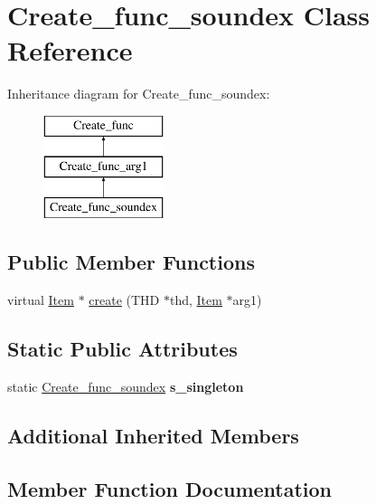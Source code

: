 \hypertarget{classCreate__func__soundex}{}\section{Create\+\_\+func\+\_\+soundex Class Reference}
\label{classCreate__func__soundex}
Inheritance diagram for Create\+\_\+func\+\_\+soundex\+:\begin{figure}[H]
\begin{center}
\leavevmode
\includegraphics[height=3.000000cm]{classCreate__func__soundex}
\end{center}
\end{figure}
\subsection*{Public Member Functions}
\begin{DoxyCompactItemize}
\item 
virtual \mbox{\hyperlink{classItem}{Item}} $\ast$ \mbox{\hyperlink{classCreate__func__soundex_a9c47f0bb57338136ad6397f320706bd2}{create}} (T\+HD $\ast$thd, \mbox{\hyperlink{classItem}{Item}} $\ast$arg1)
\end{DoxyCompactItemize}
\subsection*{Static Public Attributes}
\begin{DoxyCompactItemize}
\item 
\mbox{\label{classCreate__func__soundex_a5a0b6202f78311e8de2f4bb26677acc2}} 
static \mbox{\hyperlink{classCreate__func__soundex}{Create\+\_\+func\+\_\+soundex}} {\bfseries s\+\_\+singleton}
\end{DoxyCompactItemize}
\subsection*{Additional Inherited Members}


\subsection{Member Function Documentation}
\mbox{\label{classCreate__func__soundex_a9c47f0bb57338136ad6397f320706bd2}} 
